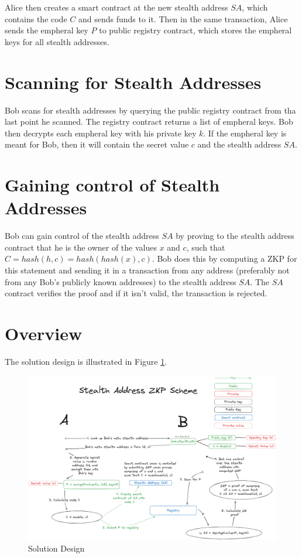 Alice then creates a smart contract at the new stealth address $SA$, which contains
the code $C$ and sends funds to it. Then in the same transaction, Alice sends
the empheral key $P$ to public registry contract, which stores the empheral
keys for all stealth addresses.

\section{Scanning for Stealth Addresses}

Bob scans for stealth addresses by querying the public registry contract
from tha last point he scanned. The registry contract returns a list of
empheral keys. Bob then decrypts each empheral key with his private key $k$.
If the empheral key is meant for Bob, then it will contain the secret value
$c$ and the stealth address $SA$.

\section{Gaining control of Stealth Addresses}

Bob can gain control of the stealth address $SA$ by proving to the stealth
address contract that he is the owner of the values $x$ and $c$, such that
$C = hash(h, c) = hash(hash(x), c)$. Bob does this by computing a ZKP for 
this statement and sending it in a transaction from any address (preferably
not from any Bob's publicly known addresses) to the stealth address $SA$. The
$SA$ contract verifies the proof and if it isn't valid, the transaction is
rejected.

\section{Overview}

The solution design is illustrated in Figure \ref{fig:solution}.

\begin{figure}[h]
    \centering
    \includegraphics[scale=0.15]{assets/images/solution.png}
    \caption{Solution Design}
    \label{fig:solution}
    \vspace{0.5cm}
\end{figure}

